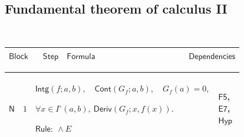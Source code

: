 \documentclass[12pt,reqno]{amsart}
\theoremstyle{blueplain}
\numberwithin{equation}{section}
\newlength{\FTCOneColumnBody}
\begin{document}
{\scriptsize \ }

\subsection{\protect\scriptsize Fundamental theorem of calculus II}

{\scriptsize {\ }}

{\scriptsize \setlength{\parskip}{0pt}\nointerlineskip
\noindent 
\begin{tabular}{|@{}>{\centering\arraybackslash}m{\FTCOneColumnBody}|}
\hline
$\displaystyle \mathsf{FTC2Proof}$ \\ \hline
\end{tabular}%
}

{\scriptsize \setlength{\parskip}{0pt}\nointerlineskip
\noindent 
\begin{tabular}{|@{}>{\centering\arraybackslash}m{0.10658\linewidth}|>{\centering\arraybackslash}m{0.03553\linewidth}|>{\centering\arraybackslash}m{0.52105\linewidth}|>{\centering\arraybackslash}m{0.23684\linewidth}|}
\hline
$\displaystyle \mathsf{Block}$ & $\displaystyle \mathsf{Step}$ & $%
\displaystyle \mathsf{Formula}$ & $\displaystyle \mathsf{Dependencies}$ \\ 
\hline
\end{tabular}%
}

{\scriptsize \setlength{\parskip}{0pt}\nointerlineskip
\noindent 
\begin{tabular}{|@{}>{\centering\arraybackslash}m{\FTCOneColumnBody}|}
\hline
$\displaystyle \mathsf{Context\_N}:=$\par$\displaystyle \mathsf{H2}%
(f,H;a,b). $ \\ \hline
\end{tabular}%
}

{\scriptsize \setlength{\parskip}{0pt}\nointerlineskip
\noindent 
\begin{tabular}{|@{}>{\centering\arraybackslash}m{0.10658\linewidth}|>{\centering\arraybackslash}m{0.03553\linewidth}|>{\centering\arraybackslash}m{0.52105\linewidth}|>{\centering\arraybackslash}m{0.23684\linewidth}|}
\hline
\hypertarget{proof:N1}{$\displaystyle \mathsf{N}$} & $\displaystyle 1$ & $%
\displaystyle \mathsf{Intg}(f;a,b),\quad\mathsf{Cont}(G_f;a,b),\quad
G_f(a)=0,$\par$\displaystyle \forall x\in I^\circ(a,b),\ \mathsf{Deriv}%
(G_f;x,f(x)).$\par$\displaystyle \mathsf{Rule}:\ \land E$ & \hyperlink{proof:F5}%
{$\displaystyle \mathsf{F5}$}, \hyperlink{proof:E7}{$\displaystyle \mathsf{E7%
}$}, \hyperlink{def:Hyp}{$\displaystyle \mathsf{Hyp}$} \\ \hline
\end{tabular}%
}
\end{document}
